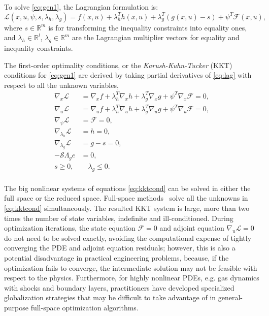 \documentclass{article}
\makeatletter
\newcommand{\eg}[0]{{e.g.\@}\xspace}
\theoremstyle{definition}
\makeatother
\begin{document}
To solve \eqref{eq:gen1}, the Lagrangian formulation is:
\begin{equation}\label{eq:lag}
\mathcal{L}(x, u, \psi, s, \lambda_h, \lambda_g) = f(x,u) + \lambda_h^T h(x, u) + \lambda_g^T (g(x,u)-s) + \psi^T \mathcal{F}(x,u),
\end{equation} 
where $s \in \mathbb{R}^m$ is for transforming the inequality constraints into equality ones, and $\lambda_h \in  \mathbb{R}^l$,  $\lambda_g \in  \mathbb{R}^m$ are the Lagrangian multiplier vectors for equality and inequality constraints. 

The first-order optimality conditions, or the \textit{Karush-Kuhn-Tucker} (KKT) conditions for \eqref{eq:gen1} are derived by taking partial derivatives of 
\eqref{eq:lag} with respect to all the unknown variables,
\begin{equation}\label{eq:kktcond}
\begin{aligned}
\nabla_x \mathcal{L} &= \nabla_x f + \lambda_h^T \nabla_x h + \lambda_g^T \nabla_x g + \psi^T \nabla_x\mathcal{F} = 0, \\
\nabla_u \mathcal{L} &= \nabla_u f + \lambda_h^T \nabla_u h + \lambda_g^T \nabla_u g + \psi^T \nabla_u\mathcal{F} = 0, \\
\nabla_{\psi} \mathcal{L} &= \mathcal{F} = 0, \\
\nabla_{\lambda_h} \mathcal{L} &= h = 0, \\
\nabla_{\lambda_g} \mathcal{L} &= g - s = 0, \\
-\mathcal{S} \Lambda_g e &= 0,\\
s \geq 0, &\quad \lambda_g \leq 0. \\
\end{aligned}
\end{equation}

The big nonlinear systems of equations \eqref{eq:kktcond} can be solved in either the full space or the reduced space.  Full-space methods~\cite{DBLP:journals/siamsc/BirosG05,DBLP:journals/siamsc/BirosG05a,haber:2001} solve all the unknowns in \eqref{eq:kktcond} simultaneously. The resulted KKT system is large, more than two times the number of state variables, indefinite and ill-conditioned. During optimization iterations, the state equation $\mathcal{F} =0$ and adjoint equation $\nabla_u \mathcal{L} = 0$ do not need to be solved exactly, avoiding the computational expense of tightly converging the PDE and adjoint equation residuals; however, this is also a potential disadvantage in practical engineering problems, because, if the optimization fails to converge, the intermediate solution may not be feasible with respect to the physics.  Furthermore, for highly nonlinear PDEs, \eg gas dynamics with shocks and boundary layers, practitioners have developed specialized globalization strategies that may be difficult to take advantage of in general-purpose full-space optimization algorithms.
\end{document}
